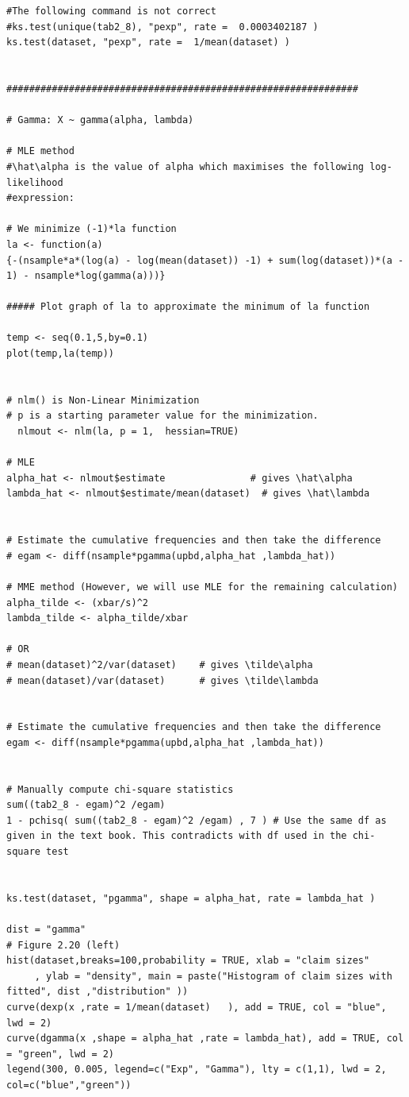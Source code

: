 \documentclass[
]{book}
\theoremstyle{definition}
\theoremstyle{definition}
\theoremstyle{definition}
\theoremstyle{definition}
\theoremstyle{remark}
\begin{document}
\begin{verbatim}
#The following command is not correct
#ks.test(unique(tab2_8), "pexp", rate =  0.0003402187 )
ks.test(dataset, "pexp", rate =  1/mean(dataset) )


##############################################################

# Gamma: X ~ gamma(alpha, lambda)

# MLE method
#\hat\alpha is the value of alpha which maximises the following log-likelihood
#expression:

# We minimize (-1)*la function
la <- function(a)
{-(nsample*a*(log(a) - log(mean(dataset)) -1) + sum(log(dataset))*(a - 1) - nsample*log(gamma(a)))}

##### Plot graph of la to approximate the minimum of la function 

temp <- seq(0.1,5,by=0.1)
plot(temp,la(temp))


# nlm() is Non-Linear Minimization
# p is a starting parameter value for the minimization.
  nlmout <- nlm(la, p = 1,  hessian=TRUE)

# MLE
alpha_hat <- nlmout$estimate               # gives \hat\alpha
lambda_hat <- nlmout$estimate/mean(dataset)  # gives \hat\lambda


# Estimate the cumulative frequencies and then take the difference
# egam <- diff(nsample*pgamma(upbd,alpha_hat ,lambda_hat))

# MME method (However, we will use MLE for the remaining calculation)
alpha_tilde <- (xbar/s)^2
lambda_tilde <- alpha_tilde/xbar

# OR
# mean(dataset)^2/var(dataset)    # gives \tilde\alpha
# mean(dataset)/var(dataset)      # gives \tilde\lambda


# Estimate the cumulative frequencies and then take the difference
egam <- diff(nsample*pgamma(upbd,alpha_hat ,lambda_hat))


# Manually compute chi-square statistics
sum((tab2_8 - egam)^2 /egam)
1 - pchisq( sum((tab2_8 - egam)^2 /egam) , 7 ) # Use the same df as given in the text book. This contradicts with df used in the chi-square test


ks.test(dataset, "pgamma", shape = alpha_hat, rate = lambda_hat )

dist = "gamma"
# Figure 2.20 (left)
hist(dataset,breaks=100,probability = TRUE, xlab = "claim sizes" 
     , ylab = "density", main = paste("Histogram of claim sizes with fitted", dist ,"distribution" ))
curve(dexp(x ,rate = 1/mean(dataset)   ), add = TRUE, col = "blue", lwd = 2)
curve(dgamma(x ,shape = alpha_hat ,rate = lambda_hat), add = TRUE, col = "green", lwd = 2)
legend(300, 0.005, legend=c("Exp", "Gamma"), lty = c(1,1), lwd = 2, col=c("blue","green"))


\end{verbatim}
\end{document}
